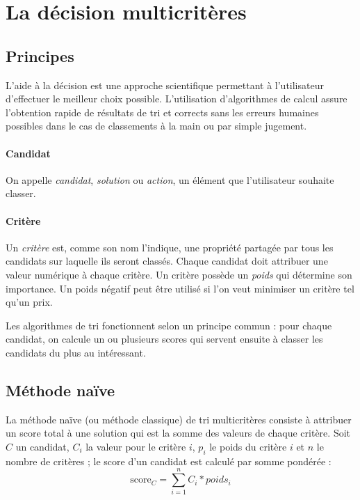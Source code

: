 \documentclass[a4paper]{article}
\begin{document}
\newpage
\tableofcontents

\newpage

\section{La décision multicritères}

\subsection{Principes}

L'aide à la décision est une approche scientifique permettant à l'utilisateur d'effectuer le meilleur choix possible. L'utilisation d'algorithmes de calcul assure l'obtention rapide de résultats de tri et corrects sans les erreurs humaines possibles dans le cas de classements à la main ou par simple jugement.

\paragraph{Candidat} On appelle \textit{candidat}, \textit{solution} ou \textit{action}, un élément que l'utilisateur souhaite classer.

\paragraph{Critère} Un \textit{critère} est, comme son nom l'indique, une propriété partagée par tous les candidats sur laquelle ils seront classés. Chaque candidat doit attribuer une valeur numérique à chaque critère. Un critère possède un \textit{poids} qui détermine son importance. Un poids négatif peut être utilisé si l'on veut minimiser un critère tel qu'un prix.

\par
Les algorithmes de tri fonctionnent selon un principe commun : pour chaque candidat, on calcule un ou plusieurs scores qui servent ensuite à classer les candidats du plus au intéressant.

\newpage

\subsection{Méthode naïve}

La méthode naïve (ou méthode classique) de tri multicritères consiste à attribuer un score total à une solution qui est la somme des valeurs de chaque critère. Soit \(C\) un candidat, \(C_i\) la valeur pour le critère \(i\), \(p_i\) le poids du critère \(i\) et \(n\) le nombre de critères ; le score d'un candidat est calculé par somme pondérée :
\[\mbox{score}_{C}=\sum_{i=1}^nC_i*poids_i\]
\end{document}

